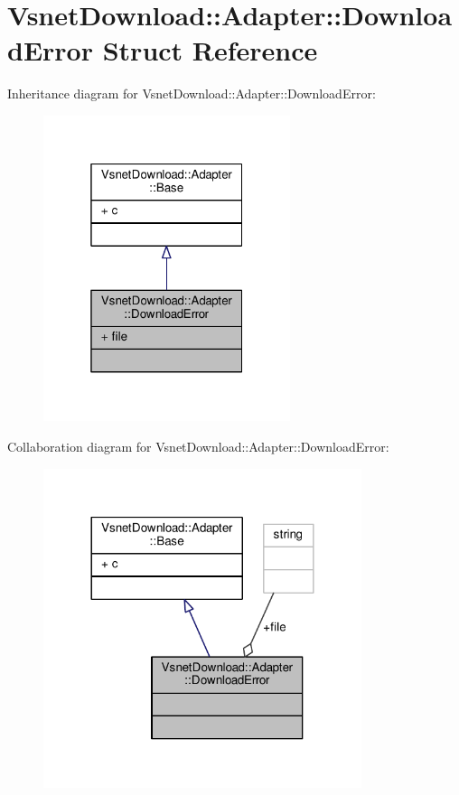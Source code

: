 \hypertarget{structVsnetDownload_1_1Adapter_1_1DownloadError}{}\section{Vsnet\+Download\+:\+:Adapter\+:\+:Download\+Error Struct Reference}
\label{structVsnetDownload_1_1Adapter_1_1DownloadError}


Inheritance diagram for Vsnet\+Download\+:\+:Adapter\+:\+:Download\+Error\+:
\nopagebreak
\begin{figure}[H]
\begin{center}
\leavevmode
\includegraphics[width=205pt]{d7/d20/structVsnetDownload_1_1Adapter_1_1DownloadError__inherit__graph}
\end{center}
\end{figure}


Collaboration diagram for Vsnet\+Download\+:\+:Adapter\+:\+:Download\+Error\+:
\nopagebreak
\begin{figure}[H]
\begin{center}
\leavevmode
\includegraphics[width=264pt]{da/de6/structVsnetDownload_1_1Adapter_1_1DownloadError__coll__graph}
\end{center}
\end{figure}
